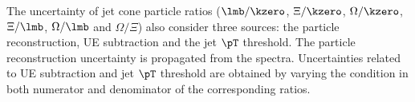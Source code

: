 The uncertainty of jet cone particle ratios ($\lmb/\kzero$, $\Xi/\kzero$, $\Omega/\kzero$, $\Xi/\lmb$, $\Omega/\lmb$ and $\Omega/\Xi$) also consider three sources: the particle reconstruction, UE subtraction and the jet $\pT$ threshold. The particle reconstruction uncertainty is propagated from the spectra. Uncertainties related to UE subtraction and jet $\pT$ threshold are obtained by varying the condition in both numerator and denominator of the corresponding ratios. 

